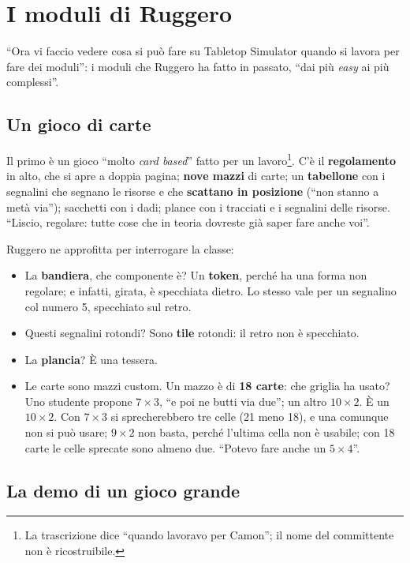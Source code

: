 \section{I moduli di Ruggero}
\label{a8:sec:moduli}

``Ora vi faccio vedere cosa si può fare su Tabletop Simulator quando si lavora per fare
dei moduli'': i moduli che Ruggero ha fatto in passato, ``dai più \emph{easy} ai più
complessi''.

\subsection{Un gioco di carte}
\label{a8:sec:mod-carte}

Il primo è un gioco ``molto \emph{card based}'' fatto per un lavoro\footnote{La
trascrizione dice ``quando lavoravo per Camon''; il nome del committente non è
ricostruibile.}. C'è il \textbf{regolamento} in alto, che si apre a doppia pagina;
\textbf{nove mazzi} di carte; un \textbf{tabellone} con i segnalini che segnano le
risorse e che \textbf{scattano in posizione} (``non stanno a metà via''); sacchetti con
i dadi; plance con i tracciati e i segnalini delle risorse. ``Liscio, regolare: tutte
cose che in teoria dovreste già saper fare anche voi''.

Ruggero ne approfitta per interrogare la classe:
\begin{itemize}
  \item La \textbf{bandiera}, che componente è? Un \textbf{token}, perché ha una forma
        non regolare; e infatti, girata, è specchiata dietro. Lo stesso vale per un
        segnalino col numero 5, specchiato sul retro.
  \item Questi segnalini rotondi? Sono \textbf{tile} rotondi: il retro non è
        specchiato.
  \item La \textbf{plancia}? È una tessera.
  \item Le carte sono mazzi custom. Un mazzo è di \textbf{18 carte}: che griglia ha
        usato? Uno studente propone $7\times3$, ``e poi ne butti via due''; un altro
        $10\times2$. È un $10\times2$. Con $7\times3$ si sprecherebbero tre celle
        (21 meno 18), e una comunque non si può usare; $9\times2$ non basta, perché
        l'ultima cella non è usabile; con 18 carte le celle sprecate sono almeno due.
        ``Potevo fare anche un $5\times4$''.
\end{itemize}

\subsection{La demo di un gioco grande}
\label{a8:sec:mod-cyberpunk}

